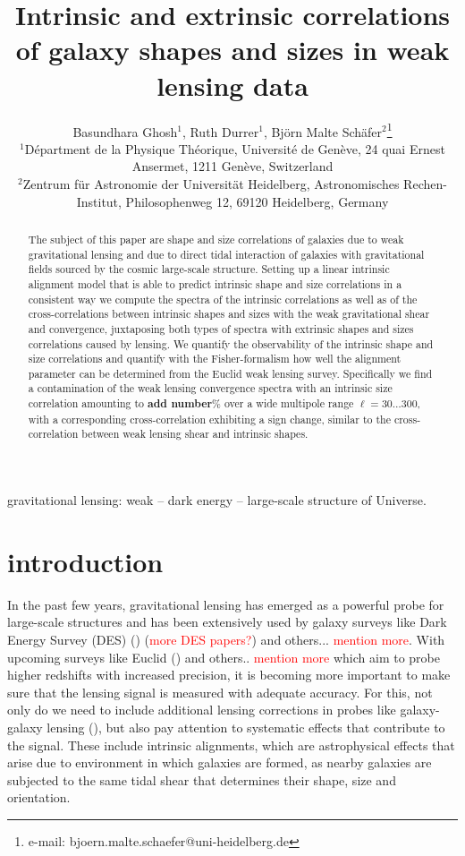 \documentclass[a4paper,fleqn,usenatbib]{mnras}
\title[Intrinsic sizes and shapes of galaxies]
{Intrinsic and extrinsic correlations of galaxy shapes and sizes in weak lensing data}
\author[B. Ghosh, R. Durrer, B.M. Sch{\"a}fer]
{Basundhara Ghosh$^1$, Ruth Durrer$^1$, Bj{\"o}rn Malte Sch{\"a}fer$^2$\thanks{e-mail: bjoern.malte.schaefer@uni-heidelberg.de}\\
$^1$D{\'e}partment de la Physique Th{\'e}orique, Universit{\'e} de Gen{\`e}ve, 24 quai Ernest Ansermet, 1211 Gen{\`e}ve, Switzerland\\
$^2$Zentrum f{\"u}r Astronomie der Universit{\"a}t Heidelberg, Astronomisches Rechen-Institut, Philosophenweg 12, 69120 Heidelberg, Germany
}
\def\spirou#1{{\bf #1}}
\newcommand\BG[1]{\textcolor{red}{#1}}
\begin{document}
\pagerange{\pageref{firstpage}--\pageref{lastpage}}
\maketitle
\label{firstpage}


\begin{abstract}
The subject of this paper are shape and size correlations of galaxies due to weak gravitational lensing and due to direct tidal interaction of galaxies with gravitational fields sourced by the cosmic large-scale structure. Setting up a linear intrinsic alignment model that is able to predict intrinsic shape and size correlations in a consistent way we compute the spectra of the intrinsic correlations as well as of the cross-correlations between intrinsic shapes and sizes with the weak gravitational shear and convergence, juxtaposing both types of spectra with extrinsic shapes and sizes correlations caused by lensing. We quantify the observability of the intrinsic shape and size correlations and quantify with the Fisher-formalism how well the alignment parameter can be determined from the Euclid weak lensing survey. Specifically we find a contamination of the weak lensing convergence spectra with an intrinsic size correlation amounting to \spirou{add number}\% over a wide multipole range $\ell=30\ldots300$, with a corresponding cross-correlation exhibiting a sign change, similar to the cross-correlation between weak lensing shear and intrinsic shapes.
\end{abstract}


\begin{keywords}
gravitational lensing: weak -- dark energy -- large-scale structure of Universe.
\end{keywords}


\section{introduction}\label{sect_intro}
In the past few years, gravitational lensing has emerged as a powerful probe for large-scale structures and has been extensively used by galaxy surveys like Dark Energy Survey (DES) (\cite{Abbott:2017wau}) (\BG{more DES papers?}) and others... \BG{mention more}. With upcoming surveys like Euclid (\cite{Amendola:2016saw}) and others.. \BG{mention more} which aim to probe higher redshifts with increased precision, it is becoming more important to make sure that the lensing signal is measured with adequate accuracy. For this, not only do we need to include additional lensing corrections in probes like galaxy-galaxy lensing (\cite{Ghosh:2018nsm}), but also pay attention to systematic effects that contribute to the signal. These include intrinsic alignments, which are astrophysical effects that arise due to environment in which galaxies are formed, as nearby galaxies are subjected to the same tidal shear that determines their shape, size and orientation.
\end{document}
